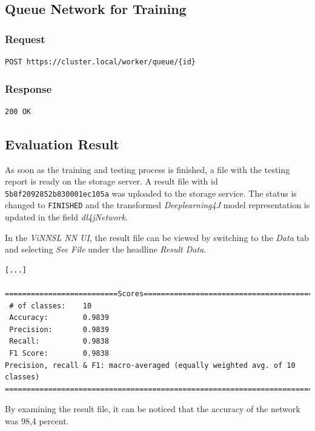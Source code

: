 \subsection{Queue Network for
Training}\label{queue-network-for-training-2}

\subsubsection{Request}\label{request-8}

\begin{verbatim}
POST https://cluster.local/worker/queue/{id}
\end{verbatim}

\subsubsection{Response}\label{response-8}

\begin{verbatim}
200 OK
\end{verbatim}

\subsection{Evaluation Result}\label{evaluation-result-2}

As soon as the training and testing process is finished, a file with the
testing report is ready on the storage server. A result file with id
\texttt{5b8f2092852b830001ec105a} was uploaded to the storage service.
The status is changed to \texttt{FINISHED} and the transformed
\emph{Deeplearning4J} model representation is updated in the field
\emph{dl4jNetwork}.

In the \emph{ViNNSL NN UI}, the result file can be viewed by switching
to the \emph{Data} tab and selecting \emph{See File} under the headline
\emph{Result Data}.

\begin{verbatim}
[...]

==========================Scores========================================
 # of classes:    10
 Accuracy:        0.9839
 Precision:       0.9839
 Recall:          0.9838
 F1 Score:        0.9838
Precision, recall & F1: macro-averaged (equally weighted avg. of 10 classes)
========================================================================
\end{verbatim}

By examining the result file, it can be noticed that the accuracy of the
network was 98,4 percent.

